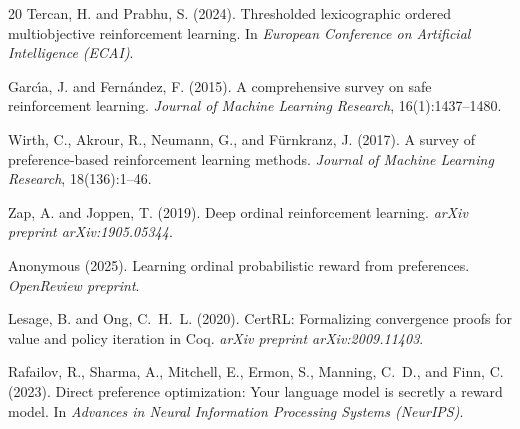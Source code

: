\documentclass[9pt,a4paper]{article}
\theoremstyle{plain}
\theoremstyle{definition}
\theoremstyle{remark}
\begin{document}
\begin{thebibliography}{20}
Tercan, H. and Prabhu, S. (2024).
Thresholded lexicographic ordered multiobjective reinforcement learning.
In \textit{European Conference on Artificial Intelligence (ECAI)}.

Garc{\'\i}a, J. and Fern{\'a}ndez, F. (2015).
A comprehensive survey on safe reinforcement learning.
\textit{Journal of Machine Learning Research}, 16(1):1437--1480.

Wirth, C., Akrour, R., Neumann, G., and F{\"u}rnkranz, J. (2017).
A survey of preference-based reinforcement learning methods.
\textit{Journal of Machine Learning Research}, 18(136):1--46.

Zap, A. and Joppen, T. (2019).
Deep ordinal reinforcement learning.
\textit{arXiv preprint arXiv:1905.05344}.

Anonymous (2025).
Learning ordinal probabilistic reward from preferences.
\textit{OpenReview preprint}.

Lesage, B. and Ong, C.~H.~L. (2020).
CertRL: Formalizing convergence proofs for value and policy iteration in Coq.
\textit{arXiv preprint arXiv:2009.11403}.

Rafailov, R., Sharma, A., Mitchell, E., Ermon, S., Manning, C.~D., and Finn, C. (2023).
Direct preference optimization: Your language model is secretly a reward model.
In \textit{Advances in Neural Information Processing Systems (NeurIPS)}.

\end{thebibliography}
\end{document}
